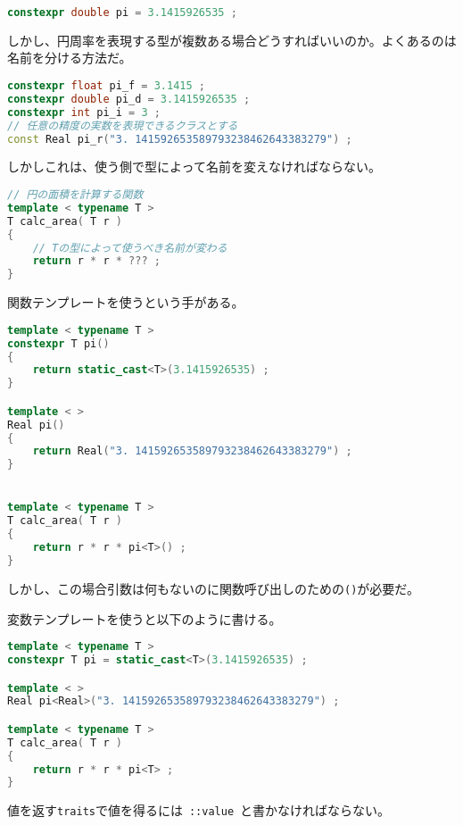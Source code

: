 \begin{lstlisting}[language=C++]
constexpr double pi = 3.1415926535 ;
\end{lstlisting}

しかし、円周率を表現する型が複数ある場合どうすればいいのか。よくあるのは名前を分ける方法だ。

\begin{lstlisting}[language=C++]
constexpr float pi_f = 3.1415 ;
constexpr double pi_d = 3.1415926535 ;
constexpr int pi_i = 3 ;
// 任意の精度の実数を表現できるクラスとする
const Real pi_r("3. 141592653589793238462643383279") ;
\end{lstlisting}

しかしこれは、使う側で型によって名前を変えなければならない。

\begin{lstlisting}[language=C++]
// 円の面積を計算する関数
template < typename T >
T calc_area( T r )
{
    // Tの型によって使うべき名前が変わる
    return r * r * ??? ;
}
\end{lstlisting}

関数テンプレートを使うという手がある。

\begin{lstlisting}[language=C++]
template < typename T >
constexpr T pi()
{
    return static_cast<T>(3.1415926535) ;
}

template < >
Real pi()
{
    return Real("3. 141592653589793238462643383279") ;
}


template < typename T >
T calc_area( T r )
{
    return r * r * pi<T>() ;
}
\end{lstlisting}

しかし、この場合引数は何もないのに関数呼び出しのための\lstinline!()!が必要だ。

変数テンプレートを使うと以下のように書ける。

\begin{lstlisting}[language=C++]
template < typename T >
constexpr T pi = static_cast<T>(3.1415926535) ;

template < >
Real pi<Real>("3. 141592653589793238462643383279") ;

template < typename T >
T calc_area( T r )
{
    return r * r * pi<T> ;
}
\end{lstlisting}


%

値を返す\lstinline!traits!で値を得るには~\lstinline!::value!~と書かなければならない。

